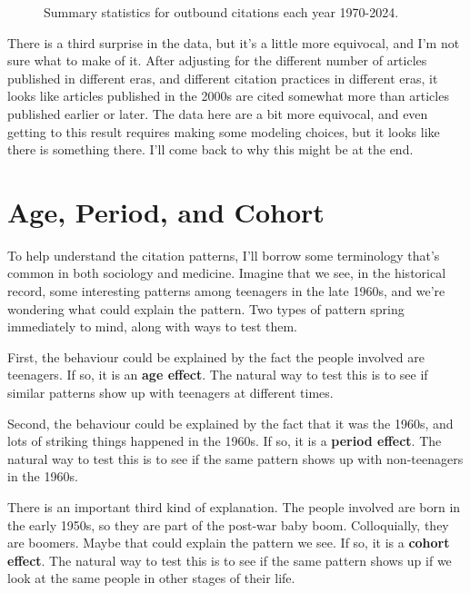 \documentclass[
  12pt,
  letterpaper,
  DIV=11,
  numbers=noendperiod]{scrartcl}
\begin{document}
\begin{figure}
\begin{minipage}{\linewidth}
{}


\end{minipage}%

\caption{\label{fig-overall-median-mode}Summary statistics for outbound
citations each year 1970-2024.}

\end{figure}%

There is a third surprise in the data, but it's a little more equivocal,
and I'm not sure what to make of it. After adjusting for the different
number of articles published in different eras, and different citation
practices in different eras, it looks like articles published in the
2000s are cited somewhat more than articles published earlier or later.
The data here are a bit more equivocal, and even getting to this result
requires making some modeling choices, but it looks like there is
something there. I'll come back to why this might be at the end.

\section{Age, Period, and Cohort}\label{sec-apc-described}

To help understand the citation patterns, I'll borrow some terminology
that's common in both sociology and medicine. Imagine that we see, in
the historical record, some interesting patterns among teenagers in the
late 1960s, and we're wondering what could explain the pattern. Two
types of pattern spring immediately to mind, along with ways to test
them.

First, the behaviour could be explained by the fact the people involved
are teenagers. If so, it is an \textbf{age effect}. The natural way to
test this is to see if similar patterns show up with teenagers at
different times.

Second, the behaviour could be explained by the fact that it was the
1960s, and lots of striking things happened in the 1960s. If so, it is a
\textbf{period effect}. The natural way to test this is to see if the
same pattern shows up with non-teenagers in the 1960s.

There is an important third kind of explanation. The people involved are
born in the early 1950s, so they are part of the post-war baby boom.
Colloquially, they are boomers. Maybe that could explain the pattern we
see. If so, it is a \textbf{cohort effect}. The natural way to test this
is to see if the same pattern shows up if we look at the same people in
other stages of their life.
\end{document}
